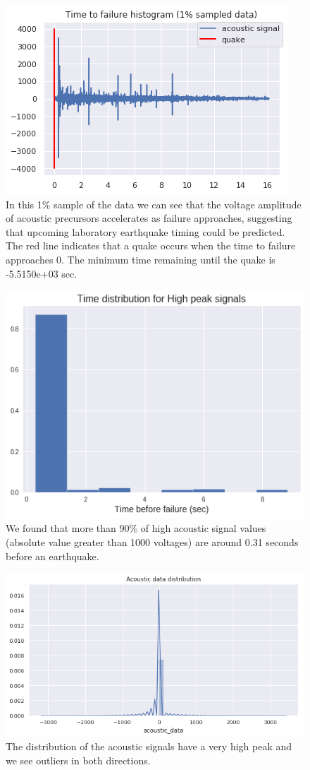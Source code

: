 \documentclass[]{llncs} %
\begin{document}
\begin{figure}
	\centering
	\includegraphics[width=.8\linewidth]{timeToFailureHistogram}
	\caption{In this 1\% sample of the data we can see that the voltage amplitude of acoustic precursors accelerates as failure approaches, suggesting that upcoming laboratory earthquake timing could be predicted. The red line indicates that a quake occurs when the time to failure approaches 0. The minimum time remaining until the quake is -5.5150e+03 sec.}
	\label{fig:timeToFailureHistogram}
\end{figure}
\begin{figure}
	\centering
	\includegraphics[width=.8\linewidth]{timeDistribution}
	\caption{We found that more than 90\% of high acoustic signal values (absolute value greater than 1000 voltages) are around 0.31 seconds before an earthquake.}
	\label{fig:timeDistribution}
\end{figure}
\begin{figure}
	\centering
	\includegraphics[width=.9\linewidth]{acousticDataDistribution}
	\caption{The distribution of the acoustic signals have a very high peak and we see outliers in both directions.}
	\label{fig:acousticDataDistribution}
\end{figure}
\end{document}
